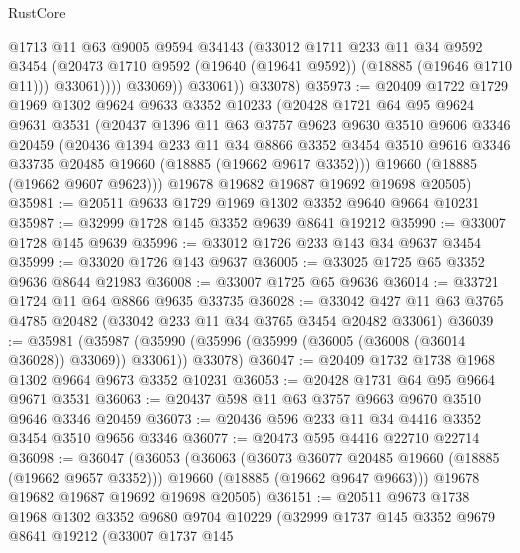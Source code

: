 \begin{lexlean}{RustCore}
\begin{coremodule}
                    @1713
                    @11
                    @63
                    @9005
                    @9594
                    @34143
                    (@33012
                      @1711
                      @233
                      @11
                      @34
                      @9592
                      @3454
                      (@20473 @1710 @9592 (@19640 (@19641 @9592)) (@18885 (@19646 @1710 @11)))
                      @33061))))
              @33069))
          @33061))
      @33078)
@35973 := @20409
    @1722
    @1729
    @1969
    @1302
    @9624
    @9633
    @3352
    @10233
    (@20428
      @1721
      @64
      @95
      @9624
      @9631
      @3531
      (@20437
        @1396
        @11
        @63
        @3757
        @9623
        @9630
        @3510
        @9606
        @3346
        @20459
        (@20436
          @1394
          @233
          @11
          @34
          @8866
          @3352
          @3454
          @3510
          @9616
          @3346
          @33735
          @20485
          @19660
          (@18885 (@19662 @9617 @3352)))
        @19660
        (@18885 (@19662 @9607 @9623)))
      @19678
      @19682
      @19687
      @19692
      @19698
      @20505)
@35981 := @20511 @9633 @1729 @1969 @1302 @3352 @9640 @9664 @10231
@35987 := @32999 @1728 @145 @3352 @9639 @8641 @19212
@35990 := @33007 @1728 @145 @9639
@35996 := @33012 @1726 @233 @143 @34 @9637 @3454
@35999 := @33020 @1726 @143 @9637
@36005 := @33025 @1725 @65 @3352 @9636 @8644 @21983
@36008 := @33007 @1725 @65 @9636
@36014 := @33721 @1724 @11 @64 @8866 @9635 @33735
@36028 := @33042 @427 @11 @63 @3765 @4785 @20482 (@33042 @233 @11 @34 @3765 @3454 @20482 @33061)
@36039 := @35981
    (@35987 (@35990 (@35996 (@35999 (@36005 (@36008 (@36014 @36028)) @33069)) @33061)) @33078)
@36047 := @20409 @1732 @1738 @1968 @1302 @9664 @9673 @3352 @10231
@36053 := @20428 @1731 @64 @95 @9664 @9671 @3531
@36063 := @20437 @598 @11 @63 @3757 @9663 @9670 @3510 @9646 @3346 @20459
@36073 := @20436 @596 @233 @11 @34 @4416 @3352 @3454 @3510 @9656 @3346
@36077 := @20473 @595 @4416 @22710 @22714
@36098 := @36047
    (@36053
      (@36063
        (@36073 @36077 @20485 @19660 (@18885 (@19662 @9657 @3352)))
        @19660
        (@18885 (@19662 @9647 @9663)))
      @19678
      @19682
      @19687
      @19692
      @19698
      @20505)
@36151 := @20511
    @9673
    @1738
    @1968
    @1302
    @3352
    @9680
    @9704
    @10229
    (@32999
      @1737
      @145
      @3352
      @9679
      @8641
      @19212
      (@33007
        @1737
        @145

\end{coremodule}
\end{lexlean}
